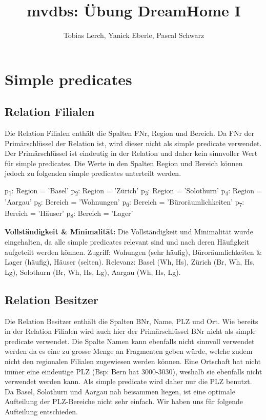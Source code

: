 \documentclass[11pt,a4paper,parskip=half]{scrartcl}
\title{mvdbs: Übung DreamHome I}
\author{Tobias Lerch, Yanick Eberle, Pascal Schwarz}
\begin{document}
\maketitle

\section{Simple predicates}
\subsection{Relation Filialen}
Die Relation Filialen enthält die Spalten FNr, Region und Bereich. Da FNr der Primärschlüssel der Relation ist, wird dieser nicht als simple predicate verwendet. Der Primärschlüssel ist eindeutig in der Relation und daher kein sinnvoller Wert für simple predicates. Die Werte in den Spalten Region und Bereich können jedoch zu folgenden simple predicates unterteilt werden.

p\textsubscript{1}: Region = 'Basel'\newline
p\textsubscript{2}: Region = 'Zürich'\newline
p\textsubscript{3}: Region = 'Solothurn'\newline
p\textsubscript{4}: Region = 'Aargau'\newline
\newline
p\textsubscript{5}: Bereich = 'Wohnungen'\newline
p\textsubscript{6}: Bereich = 'Büroräumlichkeiten'\newline
p\textsubscript{7}: Bereich = 'Häuser'\newline
p\textsubscript{8}: Bereich = 'Lager'\newline

\textbf{Vollständigkeit \& Minimalität: }
Die Vollständigkeit und Minimalität wurde eingehalten, da alle simple predicates relevant sind und nach deren Häufigkeit aufgeteilt werden können.\newline
Zugriff: Wohungen (sehr häufig),  Büroräumlichkeiten \& Lager (häufig), Häuser (selten).\newline
Relevanz: Basel (Wh, Hs), Zürich (Br, Wh, Hs, Lg), Solothurn (Br, Wh, Hs, Lg), Aargau (Wh, Hs, Lg).


\subsection{Relation Besitzer}
Die Relation Besitzer enthält die Spalten BNr, Name, PLZ und Ort. Wie bereits in der Relation Filialen wird auch hier der Primärschlüssel BNr nicht als simple predicate verwendet. Die Spalte Namen kann ebenfalls nicht sinnvoll verwendet werden da es eine zu grosse Menge an Fragmenten geben würde, welche zudem nicht den regionalen Filialen zugewiesen werden können. Eine Ortschaft hat nicht immer eine eindeutige PLZ (Bsp: Bern hat 3000-3030), weshalb sie ebenfalls nicht verwendet werden kann. Als simple predicate wird daher nur die PLZ benutzt. Da Basel, Solothurn und Aargau nah beisammen liegen, ist eine optimale Aufteilung der PLZ-Bereiche nicht sehr einfach. Wir haben uns für folgende Aufteilung entschieden.
\end{document}
